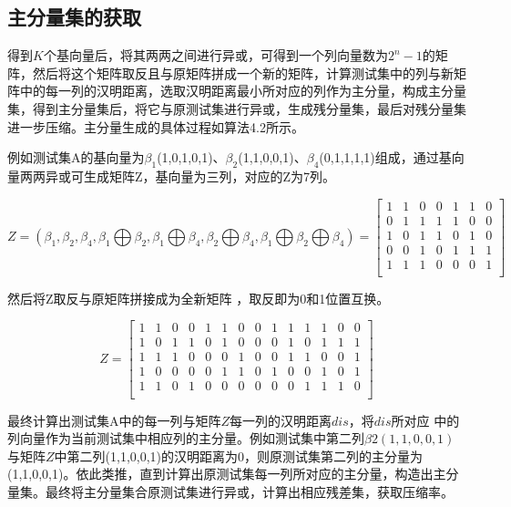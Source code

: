 \subsection{主分量集的获取}

得到$K$个基向量后，将其两两之间进行异或，可得到一个列向量数为$2^n-1$的矩阵，然后将这个矩阵取反且与原矩阵拼成一个新的矩阵，计算测试集中的列与新矩阵中的每一列的汉明距离，选取汉明距离最小所对应的列作为主分量，构成主分量集，得到主分量集后，将它与原测试集进行异或，生成残分量集，最后对残分量集进一步压缩。主分量生成的具体过程如算法4.2所示。

例如测试集A的基向量为$\beta_1$(1,0,1,0,1)、$\beta_2$(1,1,0,0,1)、$\beta_4$(0,1,1,1,1)组成，通过基向量两两异或可生成矩阵Z，基向量为三列，对应的Z为7列。

\begin{equation}
Z
=
(\beta_1,\beta_2,\beta_4,\beta_1\bigoplus \beta_2,\beta_1\bigoplus \beta_4,\beta_2\bigoplus \beta_4,\beta_1\bigoplus \beta_2\bigoplus \beta_4)
=
\left[
\begin{array}{ccccccc}
    1&1&0&0&1&1&0\\
    0&1&1&1&1&0&0\\
    1&0&1&1&0&1&0\\
    0&0&1&0&1&1&1\\
    1&1&1&0&0&0&1\\
\end{array}
\right]
\end{equation}


然后将Z取反与原矩阵拼接成为全新矩阵 ，取反即为0和1位置互换。

\begin{equation}
Z
=
\left[
\begin{array}{cccccccccccccc}
    1&1&0&0&1&1&0&0&1&1&1&1&0&0\\
    1&0&1&1&0&1&0&0&0&1&0&1&1&1\\
    1&1&1&0&0&0&1&0&0&1&1&0&0&1\\
    1&0&0&0&0&1&1&0&1&0&0&1&0&1\\
    1&1&0&1&0&0&0&0&0&0&1&1&1&0\\
\end{array}
\right]
\end{equation}

最终计算出测试集A中的每一列与矩阵$Z$每一列的汉明距离$dis$，将$dis$所对应 中的列向量作为当前测试集中相应列的主分量。例如测试集中第二列$β2(1,1,0,0,1)$ 与矩阵$Z$中第二列(1,1,0,0,1)的汉明距离为0，则原测试集第二列的主分量为(1,1,0,0,1)。依此类推，直到计算出原测试集每一列所对应的主分量，构造出主分量集。最终将主分量集合原测试集进行异或，计算出相应残差集，获取压缩率。

